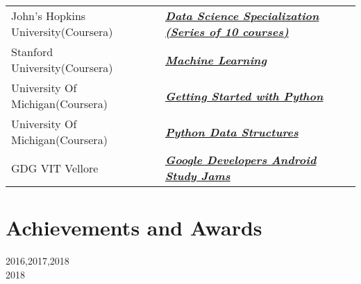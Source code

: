\documentclass[margin, centered]{res}
\begin{document}
\begin{resume}
\begin{tabular}{l l}
John's Hopkins University(Coursera) & \textbf{\textit{\href{https://www.coursera.org/account/accomplishments/specialization/VRCB8VCQ9K3C}{Data Science Specialization (Series of 10 courses)}}} \\ [1pt]
Stanford University(Coursera) & \textbf{\textit{\href{https://www.coursera.org/account/accomplishments/certificate/64DD96W9XRG2}{Machine Learning}}} \\ [1pt]
University Of Michigan(Coursera) & \textbf{\textit{\href{https://www.coursera.org/account/accomplishments/certificate/W6EJKFQ79V96}{Getting Started with Python}}} \\ [1pt]
University Of Michigan(Coursera) & \textbf{\textit{\href{https://www.coursera.org/account/accomplishments/certificate/PTFCZM25G7JV}{Python Data Structures}}} \\ [1pt]
GDG VIT Vellore & \textbf{\textit{\href{https://drive.google.com/file/d/0B9TCAG7AVugiaUhONDl6ampCZ1E/view?usp=sharing}{Google Developers Android Study Jams}}} \\ [1pt]
\end{tabular}
 

\section{Achieve\-ments and Awards}
 \hfill  2016,2017,2018\\
 \hfill  2018\\ 

\end{resume}
\end{document}
